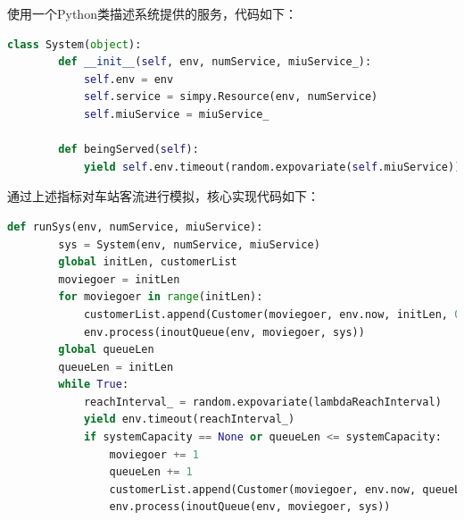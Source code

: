 





使用一个Python类描述系统提供的服务，代码如下：
\begin{lstlisting}[breaklines=true,language=Python]
    class System(object):
        def __init__(self, env, numService, miuService_):
            self.env = env
            self.service = simpy.Resource(env, numService)
            self.miuService = miuService_

        def beingServed(self):
            yield self.env.timeout(random.expovariate(self.miuService))
\end{lstlisting}

通过上述指标对车站客流进行模拟，核心实现代码如下：
\begin{lstlisting}[breaklines=true,language=Python]
    def runSys(env, numService, miuService):
        sys = System(env, numService, miuService)
        global initLen, customerList
        moviegoer = initLen
        for moviegoer in range(initLen): 
            customerList.append(Customer(moviegoer, env.now, initLen, 0))
            env.process(inoutQueue(env, moviegoer, sys))
        global queueLen
        queueLen = initLen
        while True:
            reachInterval_ = random.expovariate(lambdaReachInterval)
            yield env.timeout(reachInterval_) 
            if systemCapacity == None or queueLen <= systemCapacity:
                moviegoer += 1
                queueLen += 1
                customerList.append(Customer(moviegoer, env.now, queueLen, reachInterval_))
                env.process(inoutQueue(env, moviegoer, sys))
\end{lstlisting}



